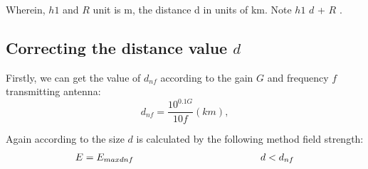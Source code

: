 \documentclass[runningheads,a4paper]{llncs}
\begin{document}
{Wherein, $h1$ and $R$ unit is m, the distance d in units of km. Note $h1$ $d$ + $R$ . 

\subsection{Correcting the distance value $d$}

Firstly, we can get the value of $d_{nf}$ according to the gain $G$ and frequency $f$ transmitting antenna:
\begin{equation}
{d_{nf}} = \frac{{{{10}^{0.1G}}}}{{10f}}(km), \label{keurough} \end{equation}

Again according to the size $d$ is calculated by the following method field strength:
\begin{equation}
\begin{array}{l}
E = {E_{maxdnf}}{\kern 1pt} {\kern 1pt} {\kern 1pt} {\kern 1pt} {\kern 1pt} {\kern 1pt} {\kern 1pt} {\kern 1pt} {\kern 1pt} {\kern 1pt} {\kern 1pt} {\kern 1pt} {\kern 1pt} {\kern 1pt} {\kern 1pt} {\kern 1pt} {\kern 1pt} {\kern 1pt} {\kern 1pt} {\kern 1pt} {\kern 1pt} {\kern 1pt} {\kern 1pt} {\kern 1pt} {\kern 1pt} {\kern 1pt} {\kern 1pt} {\kern 1pt} {\kern 1pt} {\kern 1pt} {\kern 1pt} {\kern 1pt} {\kern 1pt} {\kern 1pt} {\kern 1pt} {\kern 1pt} {\kern 1pt} {\kern 1pt} {\kern 1pt} {\kern 1pt} {\kern 1pt} {\kern 1pt} {\kern 1pt} {\kern 1pt} {\kern 1pt} {\kern 1pt} {\kern 1pt} {\kern 1pt} {\kern 1pt} {\kern 1pt} {\kern 1pt} {\kern 1pt} {\kern 1pt} {\kern 1pt} {\kern 1pt} {\kern 1pt} {\kern 1pt} {\kern 1pt} {\kern 1pt} {\kern 1pt} {\kern 1pt} {\kern 1pt} {\kern 1pt} {\kern 1pt} {\kern 1pt} {\kern 1pt} {\kern 1pt} {\kern 1pt} {\kern 1pt} {\kern 1pt} {\kern 1pt} {\kern 1pt} {\kern 1pt} {\kern 1pt} {\kern 1pt} {\kern 1pt} {\kern 1pt} {\kern 1pt} {\kern 1pt} {\kern 1pt} {\kern 1pt} {\kern 1pt} {\kern 1pt} {\kern 1pt} {\kern 1pt} {\kern 1pt} {\kern 1pt} {\kern 1pt} {\kern 1pt} {\kern 1pt} {\kern 1pt} {\kern 1pt} {\kern 1pt} {\kern 1pt} {\kern 1pt} {\kern 1pt} {\kern 1pt} {\kern 1pt} {\kern 1pt} {\kern 1pt} {\kern 1pt} {\kern 1pt} {\kern 1pt} {\kern 1pt} {\kern 1pt} {\kern 1pt} {\kern 1pt} {\kern 1pt} {\kern 1pt} {\kern 1pt} {\kern 1pt} {\kern 1pt} {\kern 1pt} {\kern 1pt} {\kern 1pt} {\kern 1pt} {\kern 1pt} {\kern 1pt} {\kern 1pt} {\kern 1pt} {\kern 1pt} {\kern 1pt} {\kern 1pt} {\kern 1pt} {\kern 1pt} {\kern 1pt} {\kern 1pt} {\kern 1pt} d < {d_{nf}}\\

\end{array}
\end{equation}}
\end{document}
